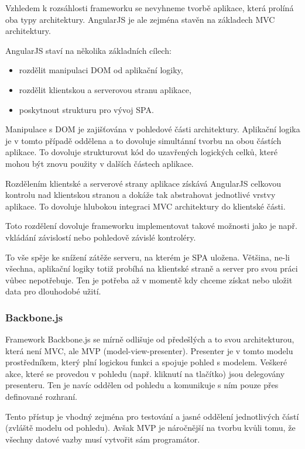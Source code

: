 Vzhledem k rozsáhlosti frameworku se nevyhneme tvorbě aplikace, která prolíná oba typy architektury. AngularJS je ale zejména stavěn na základech MVC architektury.

AngularJS staví na několika základních cílech:

\begin{itemize}
    \item rozdělit manipulaci DOM od aplikační logiky,
    \item rozdělit klientskou a serverovou stranu aplikace,
    \item poskytnout strukturu pro vývoj SPA.
\end{itemize}

Manipulace s DOM je zajišťována v pohledové části architektury. Aplikační logika je v tomto případě oddělena a to dovoluje simultánní tvorbu na obou částích aplikace. To dovoluje strukturovat kód do uzavřených logických celků, které mohou být znovu použity v dalších částech aplikace.

Rozdělením klientské a serverové strany aplikace získává AngularJS celkovou kontrolu nad klientskou stranou a dokáže tak abstrahovat jednotlivé vrstvy aplikace. To dovoluje hlubokou integraci MVC architektury do klientské části.

Toto rozdělení dovoluje frameworku implementovat takové možnosti jako je např. vkládání závislostí nebo pohledově závislé kontroléry.

To vše spěje ke snížení zátěže serveru, na kterém je SPA uložena. Většina, ne-li všechna, aplikační logiky totiž probíhá na klientské straně a server pro svou práci vůbec nepotřebuje. Ten je potřeba až v momentě kdy chceme získat nebo uložit data pro dlouhodobé užití.

\subsubsection*{Backbone.js}

Framework Backbone.js se mírně odlišuje od předešlých a to svou architekturou, která není MVC, ale MVP (model-view-presenter). Presenter je v tomto modelu prostředníkem, který plní logickou funkci a spojuje pohled s modelem. Veškeré akce, které se provedou v pohledu (např. kliknutí na tlačítko) jsou delegovány presenteru. Ten je navíc oddělen od pohledu a komunikuje s ním pouze přes definované rozhraní.

Tento přístup je vhodný zejména pro testování a jasné oddělení jednotlivých částí (zvláště modelu od pohledu). Avšak MVP je náročnější na tvorbu kvůli tomu, že všechny datové vazby musí vytvořit sám programátor.

